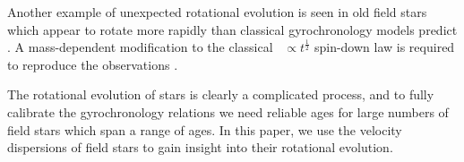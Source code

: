 Another example of unexpected rotational evolution is seen in old field stars
which appear to rotate more rapidly than classical gyrochronology models
predict \citep{angus2015, vansaders2016, vansaders2018, metcalfe2019}.
A mass-dependent modification to the classical \prot\ $\propto
t^{\frac{1}{2}}$ spin-down law \citep{skumanich1972} is required to reproduce
the observations \citep{vansaders2016, vansaders2018}.

The rotational evolution of stars is clearly a complicated process, and to
fully calibrate the gyrochronology relations we need reliable ages for large
numbers of field stars which span a range of ages.
In this paper, we use the velocity dispersions of field stars to gain insight
into their rotational evolution.

